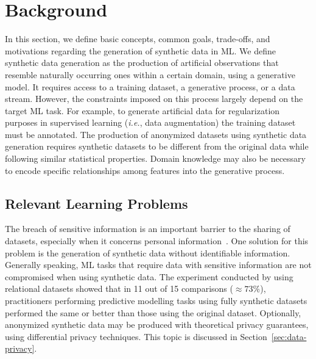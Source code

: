 \section{Background}\label{sec:background}

In this section, we define basic concepts, common goals,
trade-offs, and
motivations regarding the generation of synthetic data in ML\@. We define
synthetic data generation as the production of artificial observations that
resemble naturally occurring ones within a certain domain, using a generative
model. It requires access to a training dataset, a generative process, or a
data stream. However, the constraints imposed on this process largely
depend  on the target ML task. For example, to generate artificial data
for regularization purposes in supervised learning (\textit{i.e.}, data
augmentation) the training dataset must be annotated. The production of
anonymized datasets using synthetic data generation requires synthetic
datasets to be different from the original data while following similar
statistical properties. Domain knowledge may also be necessary to encode
specific relationships among features into the generative process.


\subsection{Relevant Learning Problems}

The breach of sensitive information is an important barrier to the sharing of
datasets, especially when it concerns personal
information~\cite{dankar2021fake}. One solution for this problem is the
generation of synthetic data without identifiable information. Generally
speaking, ML tasks that require data with sensitive information are not
compromised when using synthetic data. The experiment conducted by
\cite{patki2016synthetic} using relational datasets showed that in 11 out
of 15 comparisons ($\approx 73\%$), practitioners performing predictive
modelling tasks using fully synthetic datasets performed the same or better
than those using the original dataset. Optionally, anonymized synthetic data
may be produced with theoretical privacy guarantees, using differential
privacy techniques. This topic is discussed in Section~\ref{sec:data-privacy}.

